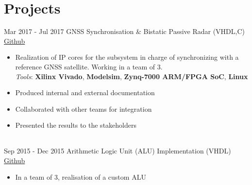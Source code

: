 \documentclass[letterpaper]{twentysecondcv} %
\begin{document}

\section{Projects}

\begin{twenty}
	\twentyitem
    	{Mar 2017 -}
		{Jul 2017}
        {GNSS Synchronisation \& Bistatic Passive Radar (VHDL,C)}
        {\href{https://github.com/artic92/sistemi-embedded-task2}{Github}}
        {}
        {
            \begin{itemize}
                \item Realization of IP cores for the subsystem in charge of synchronizing with a reference GNSS satellite. Working in a team of 3. \\
                \textit{Tools}: \textbf{Xilinx Vivado}, \textbf{Modelsim}, \textbf{Zynq-7000 ARM/FPGA SoC}, \textbf{Linux}
                \item Produced internal and external documentation
                \item Collaborated with other teams for integration
                \item Presented the results to the stakeholders
		    \end{itemize}
        }\\
	\twentyitem
    	{Sep 2015 -}
		{Dec 2015}
        {Arithmetic Logic Unit (ALU) Implementation (VHDL)}
        {\href{https://github.com/artic92/alu_xilinx}{Github}}
        {}
        {
            \begin{itemize}
                \item In a team of 3, realisation of a custom ALU\\

\end{itemize}}
\end{twenty}
\end{document}
